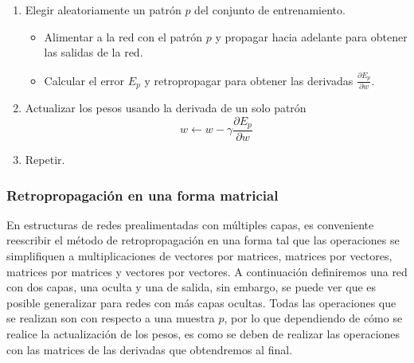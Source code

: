 \begin{itemize}
    \begin{enumerate}
        \item Elegir aleatoriamente un patrón $p$ del conjunto de entrenamiento.
        \begin{itemize}
            \item Alimentar a la red con el patrón $p$ y propagar hacia adelante para
            obtener las salidas de la red.
            \item Calcular el error $E_p$ y retropropagar para obtener las derivadas $\frac{\partial E_p}{\partial w}$.
        \end{itemize}
        \item Actualizar los pesos usando la derivada de un solo patrón
        \[
            w \leftarrow w- \gamma \frac{\partial E_p}{\partial w}
        \]
        \item Repetir.
    \end{enumerate}
\end{itemize}













\subsubsection{Retropropagación en una forma matricial}

En estructuras de redes prealimentadas con múltiples capas, es conveniente 
reescribir el método de retropropagación en una forma
tal que las operaciones se simplifiquen a multiplicaciones
de vectores por matrices, matrices por vectores, matrices por matrices y vectores por vectores.
A continuación definiremos una red con dos capas, una oculta y una de salida, sin embargo,
se puede ver que es posible generalizar para redes con más capas ocultas. Todas las operaciones que se realizan son con respecto a una muestra $p$, por lo que
dependiendo de cómo se realice la actualización de los pesos, es como se
deben de realizar las operaciones con las matrices de las derivadas que obtendremos al final.


